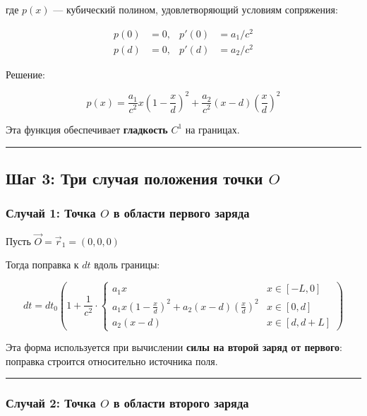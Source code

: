 \documentclass[11pt]{article}
\begin{document}
где \(p(x)\) --- кубический полином, удовлетворяющий условиям
сопряжения:

\[
\begin{aligned}
p(0) &= 0, & p'(0) &= a_1 / c^2 \\
p(d) &= 0, & p'(d) &= a_2 / c^2
\end{aligned}
\]

Решение:

\[
p(x) = \frac{a_1}{c^2} x \left(1 - \frac{x}{d}\right)^2 + \frac{a_2}{c^2} (x - d) \left(\frac{x}{d}\right)^2
\]

 Эта функция обеспечивает \textbf{гладкость} \(C^1\) на границах.

\begin{center}\rule{0.5\linewidth}{\linethickness}\end{center}

\subsection{\texorpdfstring{ Шаг 3: Три случая положения точки
\(O\)}{ Шаг 3: Три случая положения точки O}}

\subsubsection{\texorpdfstring{Случай 1: Точка \(O\) в области первого
заряда}{ Случай 1: Точка O в области первого заряда}}

Пусть \(\vec{O} = \vec{r}_1 = (0, 0, 0)\)

Тогда поправка к \(dt\) вдоль границы:

\[
\boxed{
dt = dt_0 \left( 1 + \frac{1}{c^2} \cdot
\begin{cases}
a_1 x & x \in [-L, 0] \\
a_1 x \left(1 - \frac{x}{d}\right)^2 + a_2 (x - d) \left(\frac{x}{d}\right)^2 & x \in [0, d] \\
a_2 (x - d) & x \in [d, d+L]
\end{cases}
\right)
}
\]

Эта форма используется при вычислении \textbf{силы на второй заряд от
первого}:\\
поправка строится относительно источника поля.

\begin{center}\rule{0.5\linewidth}{\linethickness}\end{center}

\subsubsection{\texorpdfstring{ Случай 2: Точка \(O\) в области второго
заряда}{ Случай 2: Точка O в области второго заряда}}
\end{document}
